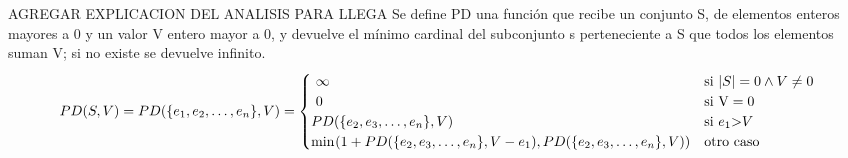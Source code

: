\documentclass[10pt,a4paper]{article}
\begin{document}
\bigskip

AGREGAR EXPLICACION DEL ANALISIS PARA LLEGA
Se define PD una función que recibe un conjunto S, de elementos enteros mayores a 0 y un valor V entero mayor a 0, y devuelve el mínimo cardinal del subconjunto s perteneciente a S que todos los elementos suman V; si no existe se devuelve infinito. \\
\[
\begin{array}{@{} r @{} c @{} l @{} }
&PD(S, V) = PD($\{$e_{1},e_{2},\dots,e_{n}$\}$,V) &{}=\displaystyle
\begin{cases}
\ \infty &\text{si } \text |S| = 0 \wedge V \neq 0 
\\
\ 0 &\text{si } \text V = 0 
\\
PD($\{$e_{2},e_{3},\dots,e_{n}$\}$,V)  &\text{si } e_{1} $>$ V
\\
\min_{} (1 + PD($\{$e_{2},e_{3},\dots,e_{n}$\}$,V - e_{1}),PD($\{$e_{2},e_{3},\dots,e_{n}$\}$,V))&\text{otro caso }
\\
\end{cases}
\end{array}
\]
\end{document}
